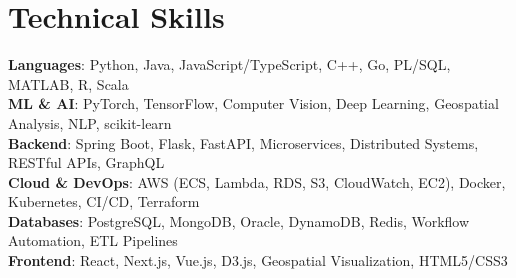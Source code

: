 \documentclass[letterpaper,11pt]{article}
\begin{document}
\section{Technical Skills}
 \begin{itemize}[leftmargin=0.15in, label={}]
    \small{\item{
     \textbf{Languages}{: Python, Java, JavaScript/TypeScript, C++, Go, PL/SQL, MATLAB, R, Scala} \\
     \textbf{ML \& AI}{: PyTorch, TensorFlow, Computer Vision, Deep Learning, Geospatial Analysis, NLP, scikit-learn} \\
     \textbf{Backend}{: Spring Boot, Flask, FastAPI, Microservices, Distributed Systems, RESTful APIs, GraphQL} \\
     \textbf{Cloud \& DevOps}{: AWS (ECS, Lambda, RDS, S3, CloudWatch, EC2), Docker, Kubernetes, CI/CD, Terraform} \\
     \textbf{Databases}{: PostgreSQL, MongoDB, Oracle, DynamoDB, Redis, Workflow Automation, ETL Pipelines} \\
     \textbf{Frontend}{: React, Next.js, Vue.js, D3.js, Geospatial Visualization, HTML5/CSS3}
    }}
 \end{itemize}

\end{document}
